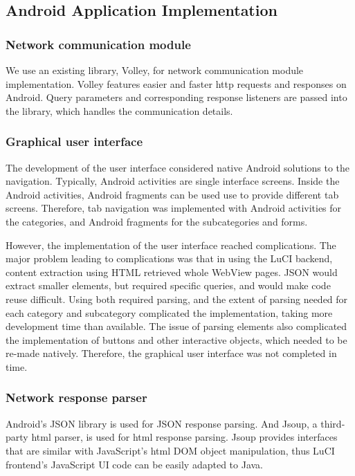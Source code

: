 \subsection{Android Application Implementation}
\subsubsection{Network communication module}
We use an existing library, Volley, for network communication module implementation. Volley features easier and faster http requests and responses on Android. Query parameters and corresponding response listeners are passed into the library, which handles the communication details.

\subsubsection{Graphical user interface}
The development of the user interface considered native Android solutions to the navigation. Typically, Android activities are single interface screens. Inside the Android activities, Android fragments can be used use to provide different tab screens. Therefore, tab navigation was implemented with Android activities for the categories, and Android fragments for the subcategories and forms.

However, the implementation of the user interface reached complications. The major problem leading to complications was that in using the LuCI backend, content extraction using HTML retrieved whole WebView pages. JSON would extract smaller elements, but required specific queries, and would make code reuse difficult. Using both required parsing, and the extent of parsing needed for each category and subcategory complicated the implementation, taking more development time than available. The issue of parsing elements also complicated the implementation of buttons and other interactive objects, which needed to be re-made natively. Therefore, the graphical user interface was not completed in time.

\subsubsection{Network response parser}

Android's JSON library is used for JSON response parsing. And Jsoup, a third-party html parser, is used for html response parsing. Jsoup provides interfaces that are similar with JavaScript's html DOM object manipulation, thus LuCI frontend's JavaScript UI code can be easily adapted to Java.
